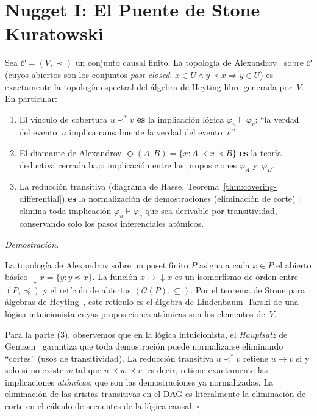 \documentclass[11pt, a4paper, openany]{book}
\newcommand{\covers}{\prec^{\!*}}
\newcommand{\diam}[2]{\Diamond(#1,#2)}
\renewenvironment{proof}[1][Demostraci\'on]{%
  \par\noindent\textit{#1.}\quad
}{\hfill$\square$\par\medskip}
\begin{document}
\section{Nugget I: El Puente de Stone--Kuratowski}

\begin{theorem}
\label{thm:stone-kuratowski}
Sea $\mathcal{C} = (V, \prec)$ un conjunto causal finito. La
topolog\'ia de Alexandrov~\cite{sorkin1991topology} sobre $\mathcal{C}$
(cuyos abiertos son los conjuntos \emph{past-closed}:
$x \in U \wedge y \prec x \Rightarrow y \in U$) es exactamente la
topolog\'ia espectral del \'algebra de Heyting libre generada por~$V$.
En particular:

\begin{enumerate}
  \item El v\'inculo de cobertura $u \covers v$ \textbf{es} la
    implicaci\'on l\'ogica $\varphi_u \vdash \varphi_v$: ``la verdad
    del evento~$u$ implica causalmente la verdad del evento~$v$.''
  \item El diamante de Alexandrov $\diam{A}{B} = \{x : A \prec x
    \prec B\}$ \textbf{es} la teor\'ia deductiva cerrada bajo
    implicaci\'on entre las proposiciones $\varphi_A$ y~$\varphi_B$.
  \item La reducci\'on transitiva (diagrama de Hasse,
    Teorema~\ref{thm:covering-differential}) \textbf{es} la
    normalizaci\'on de demostraciones (eliminaci\'on de
    corte)~\cite{gentzen1935}: elimina toda implicaci\'on
    $\varphi_u \vdash \varphi_v$ que sea derivable por
    transitividad, conservando solo los pasos inferenciales
    at\'omicos.
\end{enumerate}
\end{theorem}

\begin{proof}
La topolog\'ia de Alexandrov sobre un poset finito $P$ asigna a cada
$x \in P$ el abierto b\'asico $\downarrow\!x = \{y : y \preceq x\}$.
La funci\'on $x \mapsto \downarrow\!x$ es un isomorfismo de orden
entre $(P, \preceq)$ y el ret\'iculo de abiertos $(\mathcal{O}(P),
\subseteq)$. Por el teorema de Stone para \'algebras de
Heyting~\cite{stone1937,vickers1989}, este ret\'iculo es el \'algebra
de Lindenbaum--Tarski de una l\'ogica intuicionista cuyas
proposiciones at\'omicas son los elementos de~$V$.

Para la parte (3), observemos que en la l\'ogica intuicionista, el
\emph{Hauptsatz} de Gentzen~\cite{gentzen1935} garantiza que toda
demostraci\'on puede normalizarse eliminando ``cortes'' (usos de
transitividad). La reducci\'on transitiva $u \covers v$ retiene
$u \to v$ si y solo si no existe $w$ tal que $u \prec w \prec v$: es
decir, retiene exactamente las implicaciones \emph{at\'omicas}, que
son las demostraciones ya normalizadas. La eliminaci\'on de las aristas
transitivas en el DAG es literalmente la eliminaci\'on de corte en el
c\'alculo de secuentes de la l\'ogica causal.
\end{proof}
\end{document}

